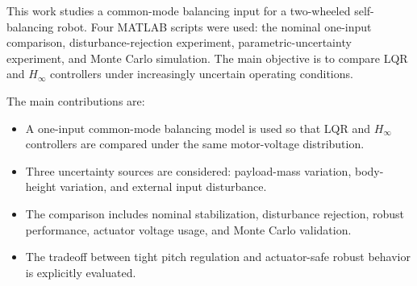 \documentclass[conference]{IEEEtran}
\begin{document}
This work studies a common-mode balancing input for a two-wheeled self-balancing robot. Four MATLAB scripts were used: the nominal one-input comparison, disturbance-rejection experiment, parametric-uncertainty experiment, and Monte Carlo simulation. The main objective is to compare LQR and $H_\infty$ controllers under increasingly uncertain operating conditions.

The main contributions are:
\begin{itemize}
\item A one-input common-mode balancing model is used so that LQR and $H_\infty$ controllers are compared under the same motor-voltage distribution.
\item Three uncertainty sources are considered: payload-mass variation, body-height variation, and external input disturbance.
\item The comparison includes nominal stabilization, disturbance rejection, robust performance, actuator voltage usage, and Monte Carlo validation.
\item The tradeoff between tight pitch regulation and actuator-safe robust behavior is explicitly evaluated.
\end{itemize}
\end{document}
